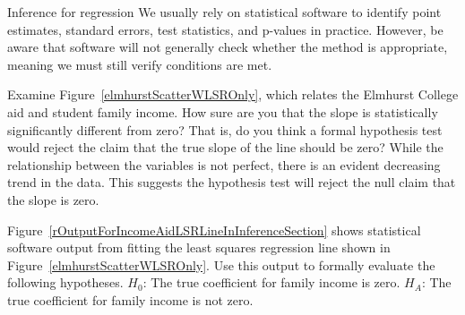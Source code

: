 
\begin{onebox}{Inference for regression}
  We usually rely on statistical software to identify point
  estimates, standard errors, test statistics, and p-values
  in practice.
  However, be aware that software will not generally
  check whether the method is appropriate, meaning we must
  still verify conditions are met.
\end{onebox}

\begin{examplewrap}
\begin{nexample}{Examine Figure~\vref{elmhurstScatterWLSROnly}, which relates the Elmhurst College aid and student family income. How sure are you that the slope is statistically significantly different from zero? That is, do you think a formal hypothesis test would reject the claim that the true slope of the line should be zero?}
\label{overallAidIncomeInfAssessOfRegrLineSlope}%
While the relationship between the variables is not perfect, there is an evident decreasing trend in the data. This suggests the hypothesis test will reject the null claim that the slope is zero.
\end{nexample}
\end{examplewrap}

\begin{exercisewrap}
\begin{nexercise}
Figure~\ref{rOutputForIncomeAidLSRLineInInferenceSection} shows statistical software output from fitting the least squares regression line shown in Figure~\ref{elmhurstScatterWLSROnly}. Use this output to formally evaluate the following hypotheses. $H_0$: The true coefficient for family income is zero. $H_A$: The true coefficient for family income is not zero.\footnotemark
\end{nexercise}
\end{exercisewrap}

